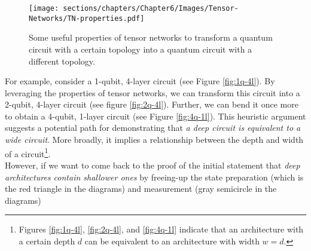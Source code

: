 \begin{itemize}
    \begin{figure}
        \centering
        \texttt{[image: sections/chapters/Chapter6/Images/Tensor-Networks/TN-properties.pdf]}
        \caption{Some useful properties of tensor networks to transform a quantum circuit with a certain 
        topology into a quantum circuit with a different topology.}
        \label{fig:tensor-prop}
    \end{figure}

    For example, consider a 1-qubit, 4-layer circuit (see Figure \ref{fig:1q-4l}). By leveraging 
    the properties of tensor networks, we can transform this circuit into a 2-qubit, 4-layer circuit 
    (see figure \ref{fig:2q-4l}). Further, we can bend it once more to obtain a 4-qubit, 
    1-layer circuit (see Figure \ref{fig:4q-1l}). This heuristic argument suggests a potential path 
    for demonstrating that \textit{a deep circuit is equivalent to a wide circuit}. 
    More broadly, it implies a relationship between the depth and width of a 
    circuit\footnote[1]{Figures \ref{fig:1q-4l}, \ref{fig:2q-4l}, and \ref{fig:4q-1l} indicate 
    that an architecture with a certain depth $d$ can be equivalent to an architecture with width 
    $w = d$.}.\\
    However, if we want to come back to the proof of the initial statement that \textit{deep architectures 
    contain shallower ones} by freeing-up the state preparation (which is the red triangle in the 
    diagrams) and measurement (gray semicircle in the diagrams) 


\end{itemize}
